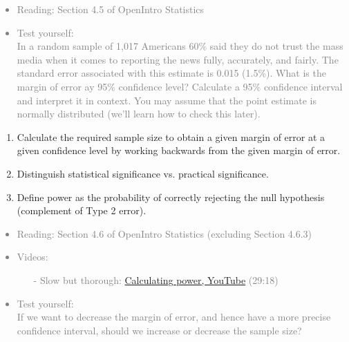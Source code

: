 \documentclass[11pt]{article}
\newcommand{\gray}[1]{\textcolor{gray}{#1}}
\begin{document}
\gray{
{\it
\vspace{-0.5cm}
\begin{itemize}
\renewcommand{\labelitemi}{{\textcolor{dark}{$\ast$}}}
\item Reading: Section 4.5 of OpenIntro Statistics
\item Test yourself: \\
{\small
In a random sample of 1,017 Americans 60\% said they do not trust the mass media when it comes to reporting the news fully, accurately, and fairly. The standard error associated with this estimate is 0.015 (1.5\%). What is the margin of error ay 95\% confidence level? Calculate a 95\% confidence interval and interpret it in context. You may assume that the point estimate is normally distributed (we'll learn how to check this later).
}
\end{itemize}
}}

%

\vspace{0.5cm}

%

\begin{enumerate}[resume]
\renewcommand\labelenumi{\textcolor{light}{\textbf{LO \theenumi.}}}

\item Calculate the required sample size to obtain a given margin of error at a given confidence level by working backwards from the given margin of error.

\item Distinguish statistical significance vs. practical significance.

\item Define power as the probability of correctly rejecting the null hypothesis (complement of Type 2 error).

\end{enumerate}

\gray{
{\it
\vspace{-0.5cm}
\begin{itemize}
\renewcommand{\labelitemi}{{\textcolor{dark}{$\ast$}}}
\item Reading: Section 4.6 of OpenIntro Statistics (excluding Section 4.6.3)
\item Videos:
\begin{itemize}
\item[-] Slow but thorough: \href{http://www.youtube.com/watch?v=QW9_T8nrApU}{Calculating power, YouTube} (29:18)
\end{itemize}
\item Test yourself: \\
{\small
If we want to decrease the margin of error, and hence have a more precise confidence interval, should we increase or decrease the sample size?
}
\end{itemize}
}}
\end{document}
